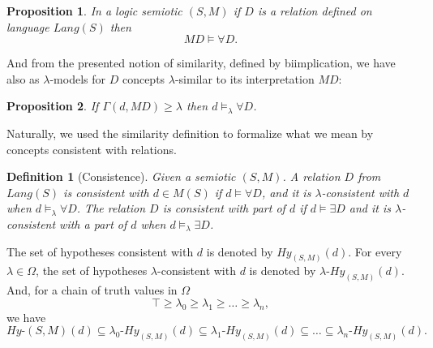 \documentclass[oribibl]{llncs}
\newtheorem{prop}{Proposition}
\newtheorem{defn}{Definition}
\begin{document}
\begin{prop}
In a logic semiotic $(S,M)$ if $D$ is a relation defined on language $Lang(S)$ then
\[MD\models \forall D.\]
\end{prop}

And from the presented notion of similarity, defined by biimplication, we have also as $\lambda$-models for $D$ concepts $\lambda$-similar to its interpretation $MD$:

\begin{prop}
If $\Gamma(d,MD)\geq \lambda$ then $d\models_\lambda \forall D$.
\end{prop}

Naturally, we used the similarity definition to formalize what we mean by concepts consistent with relations.

\begin{defn}[Consistence]
Given a semiotic $(S,M)$. A relation $D$ from $Lang(S)$ is
\emph{consistent with} $d\in M(S)$ if $d\models \forall D$, and it
is $\lambda$-\emph{consistent with} $d$ when $d\models_\lambda
\forall D$. The relation $D$ is consistent with part of $d$ if
$d\models \exists D$ and it is $\lambda$-\emph{consistent with a
part of} $d$ when $d\models_\lambda \exists D$.
\end{defn}

The set of hypotheses consistent with $d$ is denoted by
$Hy_{(S,M)}(d)$. For every $\lambda\in\Omega$, the set of hypotheses
$\lambda$-consistent with $d$ is denoted by
$\lambda$-$Hy_{(S,M)}(d)$. And, for a chain of truth values in $\Omega$
\[
\top\geq \lambda_0\geq \lambda_1\geq \ldots \geq \lambda_n,
\]
we have
\[
Hy\text{-}{(S,M)}(d)\subseteq \lambda_0\text{-}Hy_{(S,M)}(d)\subseteq  \lambda_1\text{-}Hy_{(S,M)}(d)\subseteq  \ldots \subseteq  \lambda_n\text{-}Hy_{(S,M)}(d).
\]
\end{document}
